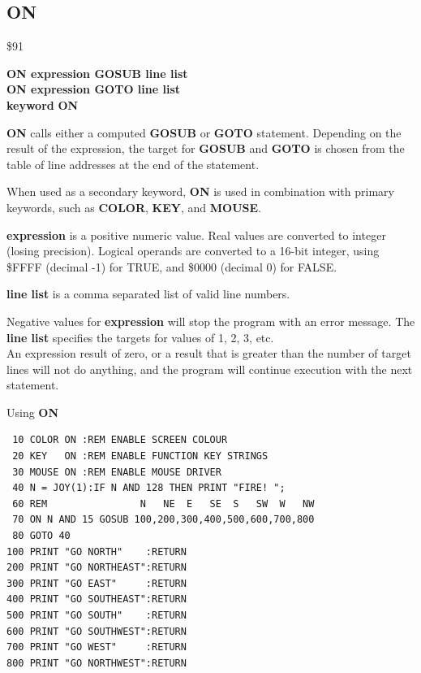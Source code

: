 \subsection{ON}
\begin{description}[leftmargin=2cm,style=nextline]
\item [Token:] \$91
\item [Format:] {\bf ON expression GOSUB line list} \\
                {\bf ON expression GOTO line list}  \\
                {\bf keyword} {\bf ON}
\item [Usage:]  {\bf ON} calls
                either a computed {\bf GOSUB} or {\bf GOTO} statement.
                Depending on the result of the expression, the target
                for {\bf GOSUB} and {\bf GOTO} is chosen from
                the table of line addresses at the end of the statement.

                When used as a secondary keyword, {\bf ON} is used in
                combination with primary keywords, such as
                {\bf COLOR}, {\bf KEY}, and  {\bf MOUSE}.

                {\bf expression} is a positive numeric value.
                Real values are converted to integer (losing precision).
                Logical operands are converted to a 16-bit integer,
                using \$FFFF (decimal -1) for TRUE,
                and \$0000 (decimal 0) for FALSE.

                {\bf line list} is a comma separated list of valid
                line numbers.

\item [Remarks:] Negative values for {\bf expression} will stop
                 the program with an error message.
                 The {\bf line list} specifies the targets for values
                 of 1, 2, 3, etc. \\
                 An expression result of zero, or a result that is greater
                 than the number of target lines will not do anything, and the
                 program will continue execution with the next statement.

\newpage
\item [Example:] Using {\bf ON}
\begin{tcolorbox}[colback=black,coltext=white]
\verbatimfont{\codefont}
\begin{verbatim}
 10 COLOR ON :REM ENABLE SCREEN COLOUR
 20 KEY   ON :REM ENABLE FUNCTION KEY STRINGS
 30 MOUSE ON :REM ENABLE MOUSE DRIVER
 40 N = JOY(1):IF N AND 128 THEN PRINT "FIRE! ";
 60 REM                N   NE  E   SE  S   SW  W   NW
 70 ON N AND 15 GOSUB 100,200,300,400,500,600,700,800
 80 GOTO 40
100 PRINT "GO NORTH"    :RETURN
200 PRINT "GO NORTHEAST":RETURN
300 PRINT "GO EAST"     :RETURN
400 PRINT "GO SOUTHEAST":RETURN
500 PRINT "GO SOUTH"    :RETURN
600 PRINT "GO SOUTHWEST":RETURN
700 PRINT "GO WEST"     :RETURN
800 PRINT "GO NORTHWEST":RETURN
\end{verbatim}
\end{tcolorbox}
\end{description}

